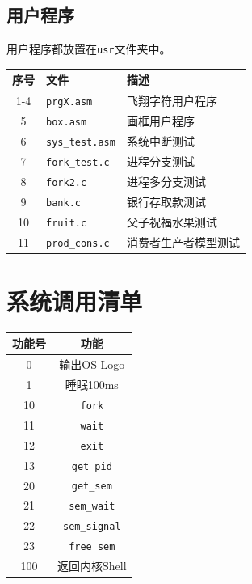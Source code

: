 \documentclass[logo,reportComp]{thesis}
\begin{document}
\subsection{用户程序}
用户程序都放置在\verb'usr'文件夹中。
\begin{center}
\begin{tabular}{|c|l|l|}\hline
\textbf{序号} & \textbf{文件} & \textbf{描述} \\\hline
1-4 & \verb'prgX.asm' & 飞翔字符用户程序\\\hline
5 & \verb'box.asm' & 画框用户程序\\\hline
6 & \verb'sys_test.asm' & 系统中断测试\\\hline
7 & \verb'fork_test.c' & 进程分支测试\\\hline
8 & \verb'fork2.c' & 进程多分支测试\\\hline
9 & \verb'bank.c' & 银行存取款测试\\\hline
10 & \verb'fruit.c' & 父子祝福水果测试\\\hline
11 & \verb'prod_cons.c' & 消费者生产者模型测试\\\hline
\end{tabular}
\end{center}

\section{系统调用清单}
\label{sec:syscall}
\begin{center}
\begin{tabular}{|c|c|}\hline
\textbf{功能号} & \textbf{功能}\\\hline
0 & 输出OS Logo\\\hline
1 & 睡眠100ms\\\hline
10 & \verb'fork'\\\hline
11 & \verb'wait'\\\hline
12 & \verb'exit'\\\hline
13 & \verb'get_pid'\\\hline
20 & \verb'get_sem'\\\hline
21 & \verb'sem_wait'\\\hline
22 & \verb'sem_signal'\\\hline
23 & \verb'free_sem'\\\hline
100 & 返回内核Shell\\\hline
\end{tabular}
\end{center}
\end{document}
